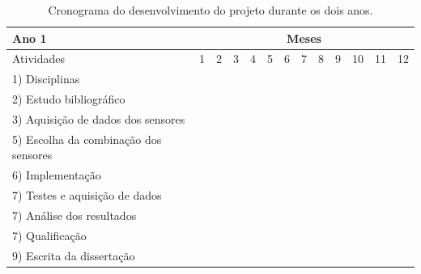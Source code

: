 \documentclass[acronym, symbols, table]{fei}
\begin{document}
		\begin{table}[!htb]
			\centering
			\caption{Cronograma do desenvolvimento do projeto durante os dois anos.}\label{tab:cronograma}
			\begin{tabular}{>{\raggedright}p{}|c|c|c|c|c|c|c|c|c|c|c|c|}
				\cline{2-13}
				Ano 1 & \multicolumn{12}{c|}{Meses} \\ \hline
				Atividades                       				 &  1 &  2 &  3 &  4 &  5 &  6 &  7 &  8 &  9 & 10 & 11 & 12 \\ \hline \hline
				\small 1) Disciplinas   						 & \X & \X & \X & \X & \X & \X & \X & \X & \X & \X & \X & \X \\ \hline
				\small 2) Estudo bibliográfico   				 & \X & \X & \X & \X & \X & \X & \X & \X & \X & \X & \X & \X \\ \hline
				\small 3) Aquisição de dados dos sensores        &    &    &    &    &    &    &    &    &    &    &    &    \\ \hline
				\small 5) Escolha da combinação dos sensores   	 &    &    &    &    &    &    &    &    &    &    &    &    \\ \hline
				\small 6) Implementação 		                 &    &    &    &    &    &    &    &    &    &    &    &    \\ \hline
				\small 7) Testes e aquisição de dados   		 &    &    &    &    &    &    &    &    &    &    &    &    \\ \hline
				\small 7) Análise dos resultados   			 	 &    &    &    &    &    &    &    &    &    &    &    &    \\ \hline
				\small 7) Qualificação   			 	 		 &    &    &    &    &    &    &    &    &    &    &    &    \\ \hline
				\small 9) Escrita da dissertação   				 &    &    &    &    &    &    &    &    &    & \X & \X & \X \\ \hline				
			\end{tabular}
			
			\hfill\break
			

\end{table}
\end{document}
